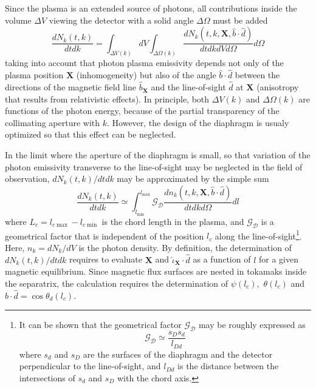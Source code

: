 Since the plasma is an extended source of photons, all contributions inside
the volume $\Delta V$ viewing the detector with a solid angle $\Delta\Omega$
must be added
\begin{equation}
\frac{dN_{k}\left( t,k\right) }{dtdk}=\int_{\Delta V\left( k\right)
}dV\int_{\Delta\Omega\left( k\right) }\frac{dN_{k}\left( t,k,\mathbf{X},%
\widehat{b}\cdot\widehat{d}\right) }{dtdkdVd\Omega}d\Omega
\end{equation}
taking into account that photon plasma emissivity depends not only of the
plasma position $\mathbf{X}$ (inhomogeneity) but also of the angle $\widehat{
b}\cdot\widehat{d}$ between the directions of the magnetic field line $%
\widehat{b}_{\mathbf{X}}$ and the line-of-sight $\widehat{d}$ at $\mathbf{X}$
(anisotropy that results from relativistic effects). In principle, both $%
\Delta V\left( k\right) $ and $\Delta\Omega\left( k\right) $ are functions
of the photon energy, because of the partial transparency of the collimating
aperture with $k$. However, the design of the diaphragm is usualy optimized
so that this effect can be neglected.

In the limit where the aperture of the diaphragm is small, so that variation
of the photon emissivity transverse to the line-of-sight may be neglected in
the field of observation, $dN_{k}\left( t,k\right) /dtdk$ may be
approximated by the simple sum
\begin{equation}
\frac{dN_{k}\left( t,k\right) }{dtdk}\simeq\int_{l_{\min}}^{l_{\max}}%
\mathcal{G}_{\mathcal{D}}\frac{dn_{k}\left( t,k,\mathbf{X},\widehat{b}\cdot%
\widehat{d}\right) }{dtdkd\Omega}dl
\end{equation}
where $L_{c}=l_{c\max}-l_{c\min}$ is the chord length in the plasma, and $%
\mathcal{G}_{\mathcal{D}}$ is a geometrical factor that is independent of
the position $l_{c}$ along the line-of-sight\footnote{%
It can be shown that the geometrical factor $\mathcal{G}_{\mathcal{D}}$ may
be roughly expressed as
\[
\mathcal{G}_{\mathcal{D}}\mathcal{\simeq}\frac{s_{D}s_{d}}{l_{Dd}}
\]
where $s_{d}$ and $s_{D}$ are the surfaces of the diaphragm and the detector
perpendicular to the line-of-sight, and $l_{Dd}$ is the distance between the
intersections of $s_{d}$ and $s_{D}$ with the chord axis.}. Here, $%
n_{k}=dN_{k}/dV$ is the photon density. By definition, the determination of $%
dN_{k}\left( t,k\right) /dtdk$ requires to evaluate $\mathbf{X}$ and $%
\widehat{\iota}_{\mathbf{X}}\cdot\widehat{d}$ as a function of $l$ for a
given magnetic equilibrium. Since magnetic flux surfaces are nested in
tokamaks inside the separatrix, the calculation requires the determination
of $\psi\left( l_{c}\right) ,$ $\theta\left( l_{c}\right) $ and $\widehat
{b}\cdot\widehat{d}=\cos\theta_{d}\left( l_{c}\right) .$

